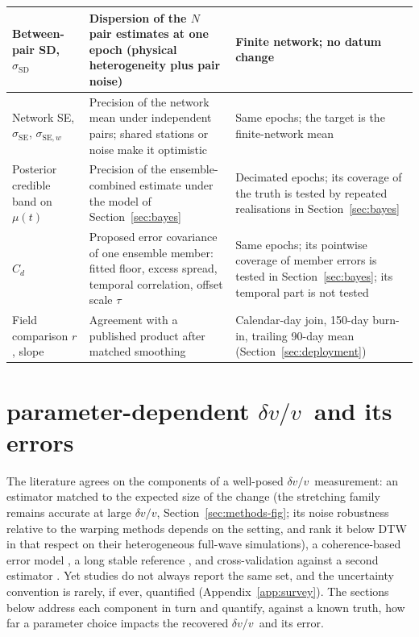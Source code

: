 \documentclass[
  referee]{gji}
\providecommand{\dvv}{\ensuremath{\delta v/v}}
\begin{document}
\begin{table}
\begin{tabularx}{\textwidth}{@{}>{\raggedright\arraybackslash}p{3.1cm} L L@{}}
Between-pair SD, $\sigma_{\mathrm{SD}}$ & Dispersion of the $N$ pair estimates
at one epoch (physical heterogeneity plus pair noise) & Finite network; no datum
change \\ \hline
Network SE, $\sigma_{\mathrm{SE}}$, $\sigma_{\mathrm{SE},w}$ & Precision of the
network mean under independent pairs; shared stations or noise make it
optimistic & Same epochs; the target is the finite-network mean \\ \hline
Posterior credible band on $\mu(t)$ & Precision of the ensemble-combined
estimate under the model of Section~\ref{sec:bayes} & Decimated epochs; its
coverage of the truth is tested by repeated realisations in
Section~\ref{sec:bayes} \\ \hline
$C_d$ & Proposed error covariance of one ensemble member: fitted
floor, excess spread, temporal correlation, offset scale $\tau$ & Same
epochs; its pointwise coverage of member errors is tested in
Section~\ref{sec:bayes}; its temporal part is not tested \\ \hline
Field comparison $r$, slope & Agreement with a published product after matched
smoothing & Calendar-day join, 150-day burn-in, trailing 90-day mean
(Section~\ref{sec:deployment}) \\
\bottomrule
\end{tabularx}
\end{table}

\section{\texorpdfstring{parameter-dependent \dvv~and its
errors}{parameter-dependent ~and its errors}}\label{sec:results}

The literature agrees on the components of a well-posed
\dvv~measurement: an estimator matched to the expected size of the
change (the stretching family remains accurate at large \dvv,
Section~\ref{sec:methods-fig}; its noise robustness relative to the
warping methods depends on the setting, and \citet{Yuan2021} rank it
below DTW in that respect on their heterogeneous full-wave simulations),
a coherence-based error model \citep{Clarke2011, Weaver2011}, a long
stable reference \citep{Wang2017}, and cross-validation against a second
estimator \citep{Obermann2019}. Yet studies do not always report the
same set, and the uncertainty convention is rarely, if ever, quantified
(Appendix~\ref{app:survey}). The sections below address each component
in turn and quantify, against a known truth, how far a parameter choice
impacts the recovered \dvv~and its error.
\end{document}
